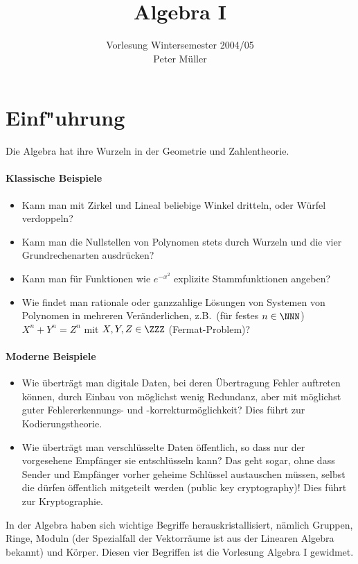 \documentclass[12pt,a4paper,twoside]{article}
\begin{document}
\title{Algebra I}
\author{Vorlesung Wintersemester 2004/05\\
Peter M\"uller}
\maketitle
\tableofcontents
\section{Einf"uhrung}
Die Algebra hat ihre Wurzeln in der Geometrie und Zahlentheorie.
\paragraph{Klassische Beispiele}
\begin{itemize}
\item Kann man mit Zirkel und Lineal beliebige Winkel dritteln, oder
  W\"urfel verdoppeln?
\item Kann man die Nullstellen von Polynomen stets durch Wurzeln und die
  vier Grundrechenarten ausdr\"ucken?
\item Kann man f\"ur Funktionen wie $e^{-x^2}$ explizite Stammfunktionen
  angeben?
\item Wie findet man rationale oder ganzzahlige L\"osungen von Systemen
  von Polynomen in mehreren Ver\"anderlichen, z.B.\ (f\"ur festes $n\in\NNN$)
  $X^n+Y^n=Z^n$ mit $X,Y,Z\in\ZZZ$ (Fermat-Problem)?
\end{itemize}
\paragraph{Moderne Beispiele}
\begin{itemize}
\item Wie \"ubertr\"agt man digitale Daten, bei deren \"Ubertragung Fehler
  auftreten k\"onnen, durch Einbau von m\"oglichst wenig Redundanz, aber mit
  m\"oglichst guter Fehlererkennungs- und -korrekturm\"oglichkeit? Dies
  f\"uhrt zur Kodierungstheorie.
\item Wie \"ubertr\"agt man verschl\"usselte Daten \"offentlich, so dass nur
  der vorgesehene Empf\"anger sie entschl\"usseln kann? Das geht sogar, ohne
  dass Sender und Empf\"anger vorher geheime Schl\"ussel austauschen m\"ussen,
  selbst die d\"urfen \"offentlich mitgeteilt werden (public key
  cryptography)! Dies f\"uhrt zur Kryptographie.
\end{itemize}
In der Algebra haben sich wichtige Begriffe herauskristallisiert, n\"amlich
Gruppen, Ringe, Moduln (der Spezialfall der Vektorr\"aume ist aus der Linearen
Algebra bekannt) und K\"orper. Diesen vier Begriffen ist die Vorlesung Algebra
I gewidmet.
\end{document}
